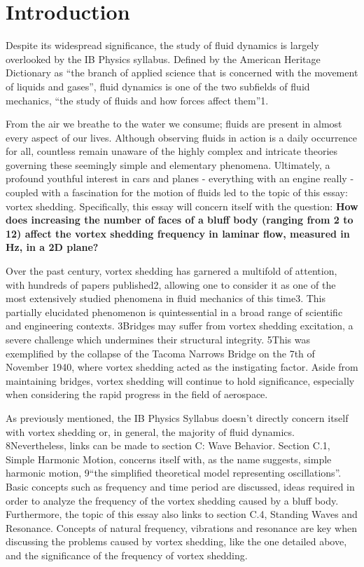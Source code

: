 \section*{Introduction}
Despite its widespread significance, the study of fluid dynamics is largely overlooked by the IB Physics syllabus. Defined by the American Heritage Dictionary as “the branch of applied science that is concerned with the movement of liquids and gases”, fluid dynamics is one of the two subfields of fluid mechanics, “the study of fluids and how forces affect them”1. 

From the air we breathe to the water we consume; fluids are present in almost every aspect of our lives. Although observing fluids in action is a daily occurrence for all, countless remain unaware of the highly complex and intricate theories governing these seemingly simple and elementary phenomena. Ultimately, a profound youthful interest in cars and planes - everything with an engine really - coupled with a fascination for the motion of fluids led to the topic of this essay: vortex shedding. Specifically, this essay will concern itself with the question: \textbf{How does increasing the number of faces of a bluff body (ranging from 2 to 12) affect the vortex shedding frequency in laminar flow, measured in Hz, in a 2D plane?}

Over the past century, vortex shedding has garnered a multifold of attention, with hundreds of papers published2, allowing one to consider it as one of the most extensively studied phenomena in fluid mechanics of this time3. This partially elucidated phenomenon is quintessential in a broad range of scientific and engineering contexts. 3Bridges may suffer from vortex shedding excitation, a severe challenge which undermines their structural integrity. 5This was exemplified by the collapse of the Tacoma Narrows Bridge on the 7th of November 1940, where vortex shedding acted as the instigating factor. Aside from maintaining bridges, vortex shedding will continue to hold significance, especially when considering the rapid progress in the field of aerospace.

As previously mentioned, the IB Physics Syllabus doesn’t directly concern itself with vortex shedding or, in general, the majority of fluid dynamics. 8Nevertheless, links can be made to section C: Wave Behavior. Section C.1, Simple Harmonic Motion, concerns itself with, as the name suggests, simple harmonic motion, 9“the simplified theoretical model representing oscillations”. Basic concepts such as frequency and time period are discussed, ideas required in order to analyze the frequency of the vortex shedding caused by a bluff body. Furthermore, the topic of this essay also links to section C.4, Standing Waves and Resonance. Concepts of natural frequency, vibrations and resonance are key when discussing the problems caused by vortex shedding, like the one detailed above, and the significance of the frequency of vortex shedding. 